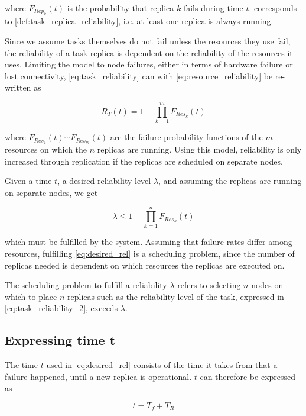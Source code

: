 \documentclass{cslthse-msc}
\begin{document}
where $F_{Rep_k}(t)$ is the probability that replica $k$ fails during time $t$.  corresponds to \cref{def:task_replica_reliability}, i.e. at least one replica is always running.

Since we assume tasks themselves do not fail unless the resources they use fail, the reliability of a task replica is dependent on the reliability of the resources it uses. Limiting the model to node failures, either in terms of hardware failure or lost connectivity, \cref{eq:task_reliability} can with \cref{eq:resource_reliability} be re-written as

\begin{equation} \label{eq:task_reliability_2}
R_{T}(t) = 1 - \prod\limits_{k=1}^m  F_{Res_k}(t)
\end{equation}

where $F_{Res_1}(t) \cdots F_{Res_m}(t)$ are the failure probability functions of the $m$ resources on which the $n$ replicas are running. Using this model, reliability is only increased through replication if the replicas are scheduled on separate nodes.

Given a time $t$, a desired reliability level $\lambda$, and assuming the replicas are running on separate nodes, we get

\begin{equation} \label{eq:desired_rel}
\lambda \leq 1 - \prod\limits_{k=1}^n  F_{Res_k}(t)
\end{equation}

which must be fulfilled by the system. Assuming that failure rates differ among resources, fulfilling \cref{eq:desired_rel} is a scheduling problem, since the number of replicas needed is dependent on which resources the replicas are executed on.

The scheduling problem to fulfill a reliability $\lambda$ refers to selecting $n$ nodes on which to place $n$ replicas such as the reliability level of the task, expressed in \cref{eq:task_reliability_2}, exceeds $\lambda$.

\subsection{Expressing time t} \label{sec:design_time_t}
The time $t$ used in \cref{eq:desired_rel} consists of the time it takes from that a failure happened, until a new replica is operational. $t$ can therefore be expressed as 

\begin{equation} \label{eq:rep_time}
	t = T_f + T_R
\end{equation}
\end{document}
